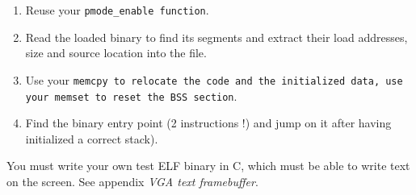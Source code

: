 \begin{itemize}
\begin{enumerate}
    \item {Reuse your \tt pmode\_enable \rm function}.

    \item {Read the loaded binary to find its segments and extract
    their load addresses, size and source location into the file}.

    \item {Use your \tt memcpy \rm to relocate the code and the
    initialized data, use your \tt memset \rm to reset the BSS section}.

    \item {Find the binary entry point (2 instructions !) and jump on
    it after having initialized a correct stack)}.

  \end{enumerate}

You must write your own test ELF binary in C, which must be able to
write text on the screen. See appendix \emph{VGA text framebuffer}.

\end{itemize}


%
%
%

%
%
%
%

%
%
%
%

